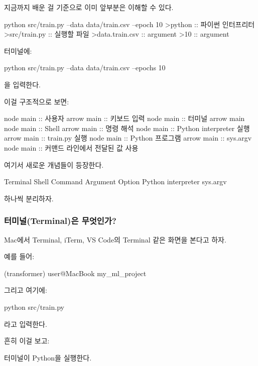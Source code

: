 지금까지 배운 걸 기준으로 이미 앞부분은 이해할 수 있다.

\begin{dhktree}
python src/train.py --data data/train.csv --epoch 10
>python :: 파이썬 인터프리터
>src/train.py :: 실행할 파일
>data.train.csv :: argument
>10 :: argument 

\end{dhktree}

터미널에:

\begin{dhkzsh}
python src/train.py --data data/train.csv --epochs 10
\end{dhkzsh}

을 입력한다.

이걸 구조적으로 보면:

\begin{dhkbranch}[in=8]
node main :: 사용자
arrow main :: 키보드 입력
node main :: 터미널
arrow main
node main :: Shell
arrow main :: 명령 해석
node main :: Python interpreter 실행
arrow main :: train.py 실행
node main :: Python 프로그램
arrow main :: sys.argv
node main :: 커맨드 라인에서 전달된 값 사용
\end{dhkbranch}

여기서 새로운 개념들이 등장한다.

\begin{dhksmry}[centered]
Terminal
Shell
Command
Argument
Option
Python interpreter
sys.argv
\end{dhksmry}

하나씩 분리하자.

\subsubsection{터미널(Terminal)은 무엇인가?}

Mac에서 Terminal, iTerm, VS Code의 Terminal 같은 화면을 본다고 하자.

예를 들어:

\begin{dhkzsh}
(transformer) user@MacBook my_ml_project %
\end{dhkzsh}

그리고 여기에:

\begin{dhkzsh}
python src/train.py
\end{dhkzsh}

라고 입력한다.

흔히 이걸 보고:

\begin{dhksmry}[centered]
터미널이 Python을 실행한다.
\end{dhksmry}

